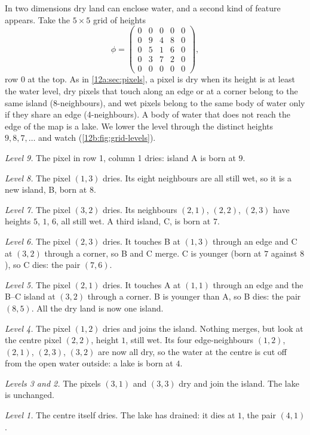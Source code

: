 In two dimensions dry land can enclose water, and a second kind of feature appears. Take the $5\times5$ grid of
heights
\begin{equation}
  \phi=\begin{pmatrix}
  0&0&0&0&0\\
  0&9&4&8&0\\
  0&5&1&6&0\\
  0&3&7&2&0\\
  0&0&0&0&0
  \end{pmatrix},
  \label{12b:eq:grid}
\end{equation}
row $0$ at the top. As in \cref{12a:sec:pixels}, a pixel is dry when its height is at least the water level,
dry pixels that touch along an edge or at a corner belong to the same island (8-neighbours), and wet pixels
belong to the same body of water only if they share an edge (4-neighbours). A body of water that does not reach
the edge of the map is a lake. We lower the level through the distinct heights $9,8,7,\dots$ and watch
(\cref{12b:fig:grid-levels}).

\emph{Level 9.} The pixel in row 1, column 1 dries: island A is born at $9$.

\emph{Level 8.} The pixel $(1,3)$ dries. Its eight neighbours are all still wet, so it is a new island, B,
born at $8$.

\emph{Level 7.} The pixel $(3,2)$ dries. Its neighbours $(2,1)$, $(2,2)$, $(2,3)$ have heights $5$, $1$, $6$,
all still wet. A third island, C, is born at $7$.

\emph{Level 6.} The pixel $(2,3)$ dries. It touches B at $(1,3)$ through an edge and C at $(3,2)$ through a
corner, so B and C merge. C is younger (born at $7$ against $8$), so C dies: the pair $(7,6)$.

\emph{Level 5.} The pixel $(2,1)$ dries. It touches A at $(1,1)$ through an edge and the B--C island at $(3,2)$
through a corner. B is younger than A, so B dies: the pair $(8,5)$. All the dry land is now one island.

\emph{Level 4.} The pixel $(1,2)$ dries and joins the island. Nothing merges, but look at the centre pixel
$(2,2)$, height $1$, still wet. Its four edge-neighbours $(1,2)$, $(2,1)$, $(2,3)$, $(3,2)$ are now all dry, so
the water at the centre is cut off from the open water outside: a lake is born at $4$.

\emph{Levels 3 and 2.} The pixels $(3,1)$ and $(3,3)$ dry and join the island. The lake is unchanged.

\emph{Level 1.} The centre itself dries. The lake has drained: it dies at $1$, the pair $(4,1)$.

